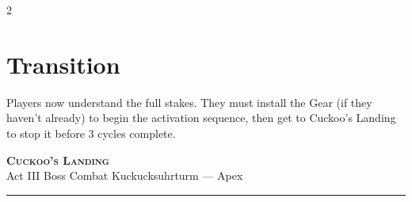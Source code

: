 \documentclass[10pt,letterpaper]{article}
\newcommand{\sceneheader}[4]{%
  \fancyhead[L]{\small\textcolor{accent}{\scshape #1}}%
  \fancyhead[R]{\small\textcolor{accent}{#2 \quad \textbullet \quad #3}}%
  \begin{center}
  {\LARGE\bfseries\scshape\textcolor{accent}{#1}}\\[2pt]
  {\small #2 \quad \textbullet \quad #3 \quad \textbullet \quad #4}\\[2pt]
  \textcolor{rulecol}{\rule{0.5\textwidth}{0.8pt}}
  \end{center}
  \vspace{-4pt}
}
\begin{document}
\begin{multicols}{2}
\section*{Transition}
Players now understand the full stakes. They must install the Gear (if they haven't already) to begin the activation sequence, then get to Cuckoo's Landing to stop it before 3 cycles complete.

\end{multicols}

\newpage


\label{sec:cuckoo}\sceneheader{Cuckoo's Landing}{Act III}{Boss Combat}{Kuckucksuhrturm --- Apex}
\end{document}
